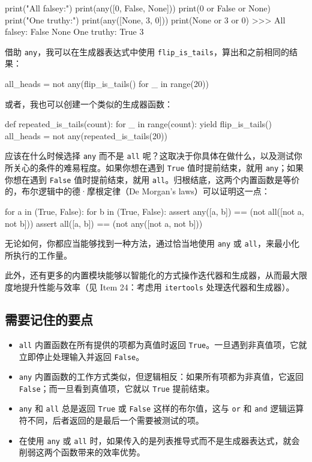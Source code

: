 \begin{codebox}[python]
print("All falsey:")
print(any([0, False, None]))
print(0 or False or None)
print("One truthy:")
print(any([None, 3, 0]))
print(None or 3 or 0)
>>>
All falsey:
False
None
One truthy:
True
3
\end{codebox}

借助 \texttt{any}，我可以在生成器表达式中使用 \texttt{flip\_is\_tails}，算出和之前相同的结果：

\begin{codebox}[python]
all_heads = not any(flip_is_tails() for _ in range(20))
\end{codebox}

或者，我也可以创建一个类似的生成器函数：

\begin{codebox}[python]
def repeated_is_tails(count):
    for _ in range(count):
        yield flip_is_tails()
all_heads = not any(repeated_is_tails(20))
\end{codebox}

应该在什么时候选择 \texttt{any} 而不是 \texttt{all} 呢？这取决于你具体在做什么，以及测试你所关心的条件的难易程度。如果你想在遇到 \texttt{True} 值时提前结束，就用 \texttt{any}；如果你想在遇到 \texttt{False} 值时提前结束，就用 \texttt{all}。归根结底，这两个内置函数是等价的，布尔逻辑中的德·摩根定律（De Morgan's laws）可以证明这一点：

\begin{codebox}[python]
for a in (True, False):
    for b in (True, False):
        assert any([a, b]) == (not all([not a, not b]))
        assert all([a, b]) == (not any([not a, not b]))
\end{codebox}

无论如何，你都应当能够找到一种方法，通过恰当地使用 \texttt{any} 或 \texttt{all}，来最小化所执行的工作量。

此外，还有更多的内置模块能够以智能化的方式操作迭代器和生成器，从而最大限度地提升性能与效率（见 Item 24：考虑用 \texttt{itertools} 处理迭代器和生成器）。

\subsection{需要记住的要点}

\begin{itemize}
\item \texttt{all} 内置函数在所有提供的项都为真值时返回 \texttt{True}。一旦遇到非真值项，它就立即停止处理输入并返回 \texttt{False}。
\item \texttt{any} 内置函数的工作方式类似，但逻辑相反：如果所有项都为非真值，它返回 \texttt{False}；而一旦看到真值项，它就以 \texttt{True} 提前结束。
\item \texttt{any} 和 \texttt{all} 总是返回 \texttt{True} 或 \texttt{False} 这样的布尔值，这与 \texttt{or} 和 \texttt{and} 逻辑运算符不同，后者返回的是最后一个需要被测试的项。
\item 在使用 \texttt{any} 或 \texttt{all} 时，如果传入的是列表推导式而不是生成器表达式，就会削弱这两个函数带来的效率优势。
\end{itemize}

